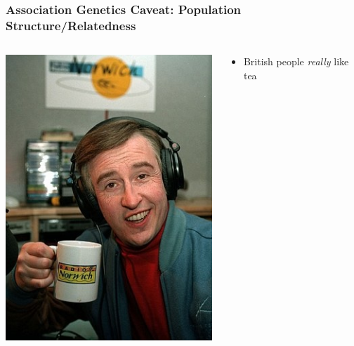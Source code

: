\documentclass[xcolor=dvipsnames]{beamer}
\begin{document}
\begin{frame}
	
	\frametitle{Association Genetics Caveat: Population Structure/Relatedness}


\begin{columns}
	\begin{column}{0.4\textwidth}
		\includegraphics[keepaspectratio, width  = \textwidth]{img/alan}				
	\end{column}
	\begin{column}{0.7\textwidth}
		\begin{itemize}
			\item British people \textit{really} like tea \\
			\vspace{15pt}

\end{itemize}
\end{column}
\end{columns}
\end{frame}
\end{document}
